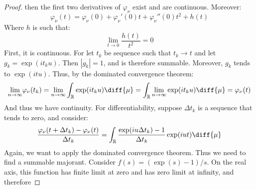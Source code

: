 \begin{proof}
                    then the first two derivatives of $\varphi_{\nu}$
                    exist and are continuous. Moreover:
                    \begin{equation}
                        \varphi_{\nu}(t)=
                        \varphi_{\nu}(0)+
                        \varphi_{\nu}'(0)t+
                        \varphi_{\nu}''(0)t^{2}+h(t)
                    \end{equation}
                    Where $h$ is such that:
                    \begin{equation}
                        \underset{t\rightarrow{0}}{\lim}
                        \frac{h(t)}{t^{2}}=0
                    \end{equation}
                    First, it is continuous. For let $t_{k}$ be
                    sequence such that $t_{k}\rightarrow{t}$ and let
                    $g_{k}=\exp(it_{k}u)$. Then $|g_{k}|=1$, and is
                    therefore summable. Moreover, $g_{k}$ tends to
                    $\exp(itu)$. Thus, by the dominated convergence
                    theorem:
                    \begin{equation}
                        \underset{n\rightarrow\infty}{\lim}
                        \varphi_{\nu}(t_{k})
                        =\underset{n\rightarrow\infty}{\lim}
                        \int_{\mathbb{R}}\exp(it_{k}u)\diff{\mu}
                        =\int_{\mathbb{R}}
                            \underset{n\rightarrow\infty}{\lim}
                            \exp(it_{k}u)\diff{\mu}
                        =\varphi_{\nu}(t)
                    \end{equation}
                    And thus we have continuity. For differentiability,
                    suppose $\Delta{t}_{k}$ is a sequence that
                    tends to zero, and consider:
                    \begin{equation}
                        \frac{\varphi_{\nu}(t+\Delta{t}_{k})-
                              \varphi_{\nu}(t)}{\Delta{t}_{k}}=
                        \int_{\mathbb{R}}
                        \frac{\exp(iu\Delta{t}_{k})-1}{\Delta{t}_{k}}
                        \exp(iut)\diff{\mu}
                    \end{equation}
                    Again, we want to apply the dominated convergence
                    theorem. Thus we need to find a summable
                    majorant. Consider $f(s)=(\exp(s)-1)/s$. On the
                    real axis, this function has finite limit at
                    zero and has zero limit at infinity, and therefore

\end{proof}
